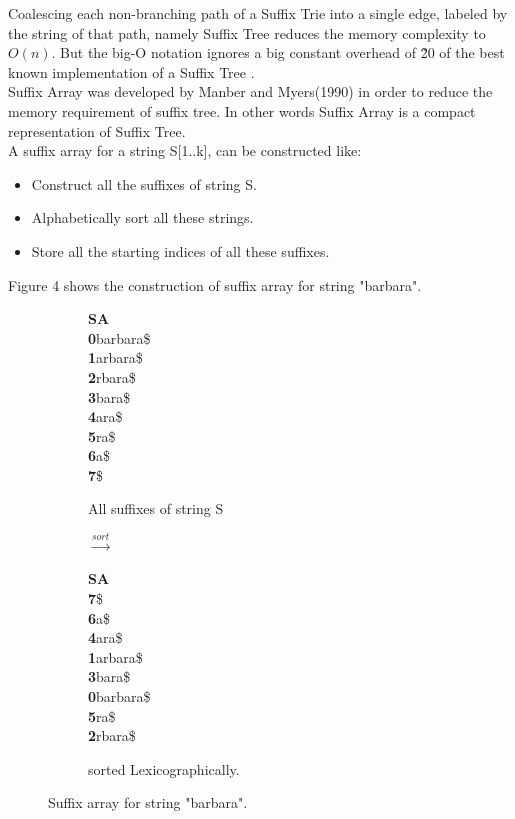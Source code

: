 \documentclass[11pt,a4paper]{report}
\begin{document}
Coalescing each non-branching path of a Suffix Trie into 
a single edge, labeled by the string of that path, namely 
Suffix Tree reduces the memory complexity to $O(n)$.
But the big-O notation ignores a big constant overhead 
of \~20 of the best known implementation of a Suffix Tree
\cite{gusfield1997algorithms}.\\ 


Suffix Array was developed by Manber and Myers(1990) in order to reduce the 
memory requirement of suffix tree. In other words Suffix Array is a compact 
representation of Suffix Tree. \\
A suffix array for a string S[1..k], can be constructed like:
\begin{itemize} 
	\item  Construct all the suffixes of string S.
	\item  Alphabetically sort all these strings.
	\item Store all the starting indices of all these suffixes.
\end{itemize}
Figure 4 shows the construction of suffix array for string "barbara".
\begin{figure}[H]
\centering
\begin{subfigure}{.2\textwidth}
\textbf{SA}  \\
\enspace  \textbf{0}\quad barbara\$\\
\textbf{1}\quad arbara\$\\
\textbf{2}\quad rbara\$\\
\textbf{3}\quad  bara\$\\
\textbf{4}\quad   ara\$\\
\textbf{5}\quad     ra\$\\
\textbf{6}\quad     a\$\\
\textbf{7}\quad       \$
  \caption{All suffixes of string S}
  \label{fig:sub1}
\end{subfigure}%
\begin{subfigure}{.2\textwidth}
\textbf{$\xrightarrow{sort}$}
\label{fig:sub1}
\end{subfigure}%
\begin{subfigure}{.3\textwidth}
\textbf{SA} \\
\textbf{7}\quad \$\\
\textbf{6}\quad a\$\\
\textbf{4}\quad ara\$\\
\textbf{1}\quad arbara\$\\
\textbf{3}\quad bara\$\\
\textbf{0}\quad barbara\$\\
\textbf{5}\quad ra\$\\
\textbf{2}\quad rbara\$
 \caption{sorted  Lexicographically.}
  \label{fig:Burrows-Wheeler transform}
\end{subfigure}
\caption{Suffix array for string "barbara".}
\label{fig:test}
\end{figure}
\end{document}
